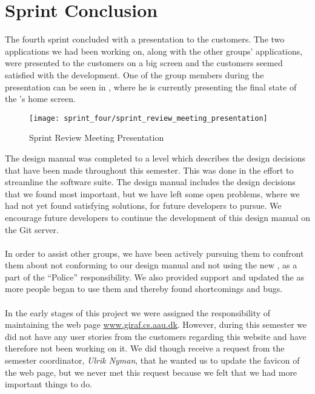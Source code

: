 
\chapter{Sprint Conclusion}
\label{cha:conclusion_sprint_4}

The fourth sprint concluded with a presentation to the customers. The two applications we had been working on, along with the other groups' applications, were presented to the customers on a big screen and the customers seemed satisfied with the development. One of the group members during the presentation can be seen in , where he is currently presenting the final state of the \launcher 's home screen.

\begin{figure}[!htbp]
    \centering
    \texttt{[image: sprint\_four/sprint\_review\_meeting\_presentation]}
    \caption{Sprint Review Meeting Presentation}
    \label{fig:sprint_review_meeting_presentation}
\end{figure}

\FloatBarrier

The design manual was completed to a level which describes the design decisions that have been made throughout this semester. This was done in the effort to streamline the \giraf software suite. The design manual includes the design decisions that we found most important, but we have left some open problems, where we had not yet found satisfying solutions, for future \giraf developers to pursue. We encourage future \giraf developers to continue the development of this design manual on the \giraf Git server.
\\\\
In order to assist other groups, we have been actively pursuing them to confront them about not conforming to our design manual and not using the new \gc, as a part of the ``\giraf Police'' responsibility. We also provided support and updated the \gc as more people began to use them and thereby found shortcomings and bugs. 
\\\\
In the early stages of this project we were assigned the responsibility of maintaining the web page \url{www.giraf.cs.aau.dk}. However, during this semester we did not have any user stories from the customers regarding this website and have therefore not been working on it. We did though receive a request from the semester coordinator, \emph{Ulrik Nyman}, that he wanted us to update the favicon of the web page, but we never met this request because we felt that we had more important things to do.